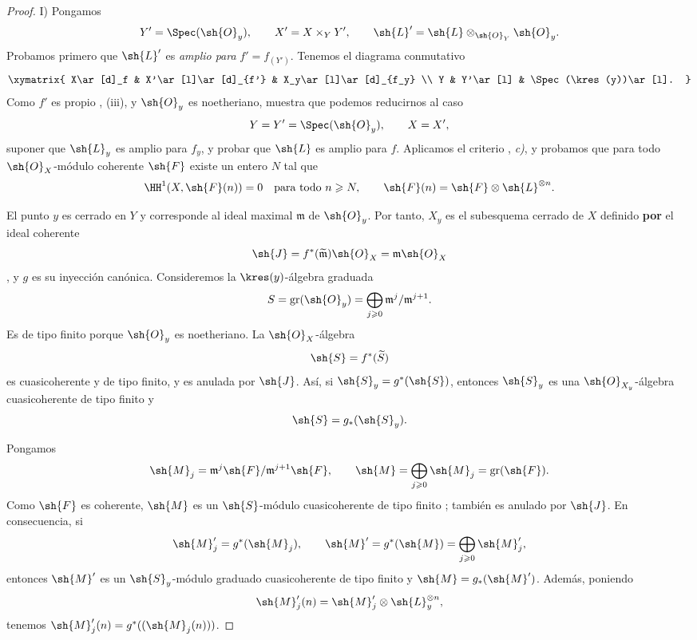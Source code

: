 \documentclass[oneside]{amsart}
\renewcommand{\geq}{\geqslant}
\newcommand{\oldpage}[2][]{{\marginnote{\normalfont\textbf{#1}~|~#2}}\ignorespaces}
\begin{document}
\begin{proof}
\oldpage[III]{145}

\noindent I) Pongamos
\[
  Y'=\Spec(\sh{O}_y),\qquad
  X'=X\times_Y Y',\qquad
  \sh{L}'=\sh{L}\otimes_{\sh{O}_Y}\sh{O}_y.
\]
Probamos primero que $\sh{L}'$ es \emph{amplio para} $f'=f_{(Y')}$. Tenemos
el diagrama conmutativo
\[
  \xymatrix{
    X\ar[d]_f
      &
    X'\ar[l]\ar[d]_{f'}
      &
    X_y\ar[l]\ar[d]_{f_y}
    \\
    Y
      &
    Y'\ar[l]
      &
    \Spec(\kres(y))\ar[l].
  }
\]
Como $f'$ es propio , (iii), y $\sh{O}_y$ es
noetheriano,  muestra que podemos reducirnos al caso
\[
  Y=Y'=\Spec(\sh{O}_y),\qquad X=X',
\]
suponer que $\sh{L}_y$ es amplio para $f_y$, y probar que $\sh{L}$
es amplio para $f$. Aplicamos el criterio
, \emph{c)}, y probamos que para todo
$\sh{O}_X$-módulo coherente $\sh{F}$ existe un entero $N$ tal que
\[
  \HH^1(X,\sh{F}(n))=0
  \quad\text{para todo }n\geq N,
  \qquad
  \sh{F}(n)=\sh{F}\otimes\sh{L}^{\otimes n}.
\]

El punto $y$ es cerrado en $Y$ y corresponde al ideal maximal
$\mathfrak m$ de $\sh{O}_y$. Por tanto, $X_y$ es el
subesquema cerrado de $X$ definido \textbf{por} el ideal coherente
\[
  \sh{J}
  =
  f^*(\widetilde{\mathfrak m})\sh{O}_X
  =
  \mathfrak m\sh{O}_X
\]
, y $g$ es su inyección canónica. Consideremos
la $\kres(y)$-álgebra graduada
\[
  S=\operatorname{gr}(\sh{O}_y)
   =\bigoplus_{j\geq0}
      \mathfrak m^j/\mathfrak m^{j+1}.
\]
Es de tipo finito porque $\sh{O}_y$ es noetheriano. La
$\sh{O}_X$-álgebra
\[
  \sh{S}=f^*(\widetilde S)
\]
es cuasicoherente y de tipo finito, y es anulada por
$\sh{J}$. Así, si $\sh{S}_y=g^*(\sh{S})$, entonces $\sh{S}_y$ es una
$\sh{O}_{X_y}$-álgebra cuasicoherente de tipo finito y
\[
  \sh{S}=g_*(\sh{S}_y).
\]

Pongamos
\[
  \sh{M}_j
  =
  \mathfrak m^j\sh{F}/\mathfrak m^{j+1}\sh{F},
  \qquad
  \sh{M}
  =
  \bigoplus_{j\geq0}\sh{M}_j
  =
  \operatorname{gr}(\sh{F}).
\]
Como $\sh{F}$ es coherente, $\sh{M}$ es un
$\sh{S}$-módulo cuasicoherente de tipo finito ; también es
anulado por $\sh{J}$. En consecuencia, si
\[
  \sh{M}'_j=g^*(\sh{M}_j),
  \qquad
  \sh{M}'=g^*(\sh{M})
    =\bigoplus_{j\geq0}\sh{M}'_j,
\]
entonces $\sh{M}'$ es un $\sh{S}_y$-módulo graduado cuasicoherente de
tipo finito y $\sh{M}=g_*(\sh{M}')$. Además, poniendo
\[
  \sh{M}'_j(n)
  =
  \sh{M}'_j\otimes\sh{L}_y^{\otimes n},
\]
tenemos $\sh{M}'_j(n)=g^*((\sh{M}_j(n)))$.


\end{proof}
\end{document}
